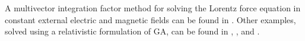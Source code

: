 A multivector integration factor method for solving the Lorentz force equation in constant external electric and magnetic fields can be found in \citep{hestenes1999nfc}.  Other examples, solved using a relativistic formulation of GA, can be found in \citep{doran2003gap},
\citep{hestenes1974properdynamics}, and
\citep{hestenes1974propermechanics}.
